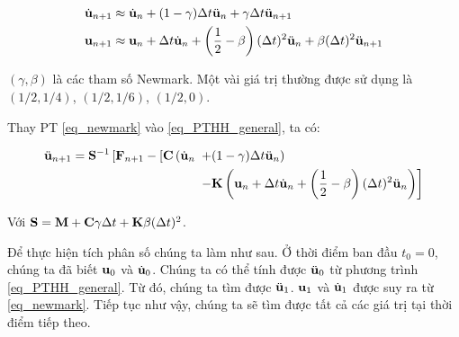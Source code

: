 \begin{equation}\label{eq_newmark}
    \begin{aligned}
    \dot{\bf u}_{n+1} &\approx \dot{\bf u}_n+(1-\gamma) \Delta t \ddot{\bf u}_n+\gamma \Delta t \ddot{\bf u}_{n+1}\\
    {\bf u}_{n+1} &\approx {\bf u}_n+\Delta t \dot{\bf u}_n+\left(\frac{1}{2}-\beta\right)(\Delta t)^2 \ddot{\bf u}_n+\beta(\Delta t)^2 \ddot{\bf u}_{n+1}
\end{aligned}
\end{equation}

$(\gamma, \beta)$ là các tham số Newmark. Một vài giá trị thường được sử dụng là $(1/2, 1/4)$, $(1/2, 1/6)$, $(1/2, 0)$.

Thay PT \cref{eq_newmark} vào \cref{eq_PTHH_general}, ta có:

\begin{equation}
    \begin{aligned}
    \ddot{\bf u}_{n+1}={\bf S}^{-1}\left[{\bf F}_{n+1}-[{\bf C}\left(\dot{\bf u}_n\right.\right. & \left.+(1-\gamma) \Delta t \ddot{\bf u}_n\right) \\
& \left.-{\bf K}\left({\bf u}_n+\Delta t \dot{\bf u}_n+\left(\frac{1}{2}-\beta\right)(\Delta t)^2 \ddot{\bf u}_n\right)\right]
\end{aligned}
\end{equation}

Với ${\bf S} = {\bf M} + {\bf C}\gamma\Delta t + {\bf K}\beta(\Delta t)^2$.

Để thực hiện tích phân số chúng ta làm như sau. Ở thời điểm ban đầu $t_0=0$, chúng ta đã biết ${\bf u}_0$ và $\dot{\bf u}_0$. Chúng ta có thể tính được $\ddot{\bf u}_0$ từ phương trình \cref{eq_PTHH_general}. Từ đó, chúng ta tìm được $\ddot{\bf u}_1$. ${\bf u}_1$ và $\dot{\bf u}_1$ được suy ra từ \cref{eq_newmark}. Tiếp tục như vậy, chúng ta sẽ tìm được tất cả các giá trị tại thời điểm tiếp theo.
